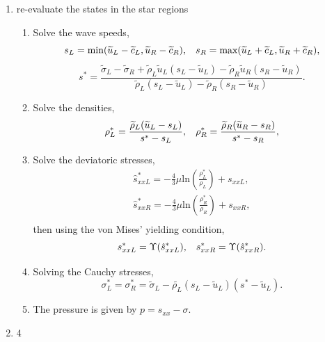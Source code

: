 \documentclass{article}
\numberwithin{equation}{section}
\numberwithin{table}{section}
\begin{document}
\begin{enumerate}
\begin{enumerate}
        \end{enumerate}
  \item re-evaluate the states in the star regions
  \begin{enumerate}
    \item Solve the wave speeds,
\begin{equation*}
  s_L = \text{min} (\widetilde{u}_L-\widetilde{c}_L, \widetilde{u}_R-\widetilde{c}_R), \hspace{0.3cm} s_R = \text{max}(\widetilde{u}_L+\widetilde{c}_L, \widetilde{u}_R+\widetilde{c}_R),
	\end{equation*}
	\begin{equation*}
	  s^* = \frac{\widetilde{\sigma}_L-\widetilde{\sigma}_R+\widetilde{\rho}_L \widetilde{u}_L(s_L-\widetilde{u}_L)-\widetilde{\rho}_R \widetilde{u}_R(s_R-\widetilde{u}_R)}{\widetilde{\rho}_L(s_L-\widetilde{u}_L)-\widetilde{\rho}_R(s_R-\widetilde{u}_R)}.
\end{equation*}

    \item Solve the densities,
\begin{equation*}
  \rho_L^* = \frac{\widetilde{\rho}_L(\widetilde{u}_L-s_L)}{s^*-s_L}, \hspace{0.3cm}  \rho_R^* = \frac{\widetilde{\rho}_R(\widetilde{u}_R-s_R)}{s^*-s_R},
\end{equation*}

    \item Solve the deviatoric stresses,
 \begin{align*}
  \hat{s}_{xxL}^* =  -\frac{4}{3}\mu \text{ln}\left( \frac{\rho_L^*}{\rho_L}  \right)+s_{xxL},\\
  \hat{s}_{xxR}^* =  -\frac{4}{3}\mu \text{ln}\left( \frac{\rho_R^*}{\rho_R}  \right)+s_{xxR},\\
\end{align*}
then using  the von Mises' yielding condition,
\begin{equation*}
  s_{xxL}^* = \Upsilon(\hat{s}_{xxL}^*) , \hspace{0.3cm}  s_{xxR}^* = \Upsilon(\hat{s}_{xxR}^*).
\end{equation*}

    \item Solving the Cauchy stresses,
\begin{equation*}
  \sigma_L^*=\sigma_R^*=\widetilde{\sigma}_L -\widetilde{\rho_L} (s_L-\widetilde{u}_L)(s^*-\widetilde{u}_L).
\end{equation*}

     \item The pressure is given by $p =s_{xx}-\sigma$.
  \end{enumerate}
  \item 4
\end{enumerate}
\end{document}
